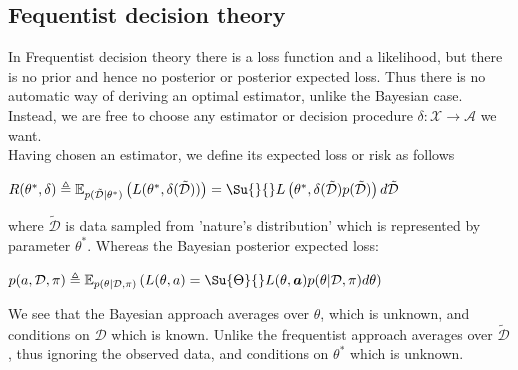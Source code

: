 \subsection{Fequentist decision theory}
In Frequentist decision theory there is a loss function and a likelihood, but there
is no prior and hence no posterior or posterior expected loss. Thus there is no 
automatic way of deriving an optimal estimator, unlike the Bayesian case.\\
Instead, we are free to choose any estimator or decision procedure $\delta: \mathcal{X}
\rightarrow \mathcal{A}$ we want.\\
Having chosen an estimator, we define its expected loss or risk as follows
\begin{center}
 $R(\theta^{*}, \delta) \triangleq \mathbb{E}_{p(\tilde{\mathcal{D}}|\theta^{*})}
\left(L(\theta^{*}, \delta(\tilde{\mathcal{D}}))\right) = \Su{}{}L\left(\theta^{*},
\delta(\tilde{\mathcal{D}})p(\tilde{\mathcal{D}})\right)d\tilde{\mathcal{D}}$   
\end{center}
where $\tilde{\mathcal{D}}$ is data sampled from 'nature's distribution' which is 
represented by parameter $\theta^{*}$.
Whereas the Bayesian posterior expected loss: 
\begin{center}
    $p(a, \mathcal{D, \pi}) \triangleq \mathbb{E}_{p(\theta|\mathcal{D},\pi)}\left(
        L(\theta, a) = \Su{\Theta}{}L(\theta, \bm{a})p(\theta|\mathcal{D}, \pi)d\theta
    \right)$
\end{center}
We see that the Bayesian approach averages over $\theta$, which is unknown, and conditions
on $\mathcal{D}$ which is known. Unlike the frequentist approach averages over $\tilde{
\mathcal{D}}$, thus ignoring the observed data, and conditions on $\theta^{*}$ which is 
unknown.

